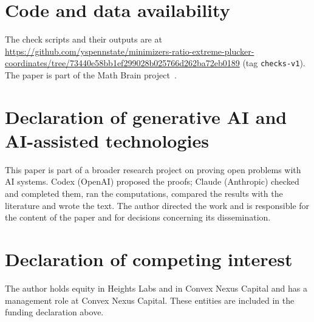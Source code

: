 \documentclass[11pt]{article}
\theoremstyle{remark}
\begin{document}
\section*{Code and data availability}
The check scripts and their outputs are at \url{https://github.com/yspennstate/minimizers-ratio-extreme-plucker-coordinates/tree/73440e58bb1ef299028b025766d262ba72eb0189} (tag \texttt{checks-v1}). The paper is part of the Math Brain project~\cite{MathBrainRepo}.

\section*{Declaration of generative AI and AI-assisted technologies}
This paper is part of a broader research project on proving open problems with AI systems. Codex (OpenAI) proposed the proofs; Claude (Anthropic) checked and completed them, ran the computations, compared the results with the literature and wrote the text. The author directed the work and is responsible for the content of the paper and for decisions concerning its dissemination.

\section*{Declaration of competing interest}
The author holds equity in Heights Labs and in Convex Nexus Capital and has a management role at Convex Nexus Capital. These entities are included in the funding declaration above.

\appendix
\end{document}
